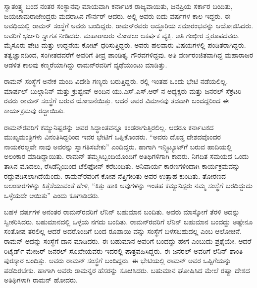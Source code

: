 ಸ್ವಾತಂತ್ರ್ಯ ಬಂದ ನಂತರ ಸಂಸ್ಥಾನವು ಮಾಯವಾಗಿ ಕರ್ನಾಟಕ ರಾಜ್ಯವಾಯಿತು, ಜನಪ್ರಿಯ ಸರ್ಕಾರ ಬಂದಿತು, ಜಯಚಾಮರಾಜೇಂದ್ರರು ಮದರಾಸಿನ ಗೌರ್ನರ್ ಆದರು. ಅಲ್ಲಿ ಅವರು ಐದು ವರ್ಷಗಳ ಕಾಲ ಇದ್ದರು. ಈ ಅವಧಿಯಲ್ಲಿ ರಾಮನ್ ಸಂಸ್ಥೆಗೆ ಅವರು ಬಂದಿದ್ದರು. ರಾಮನ್‍ರವರು ಆದ್ಧೂರಿಯ ಸಮಾರಂಭವನ್ನು ಆಯೋಜಿಸಿದರು. ಅವರಿಗೆ ಭರ್ಜರಿ ಸ್ವಾಗತ ನೀಡಿದರು. ಮಹಾರಾಜರು ನೋಡಲು ಆಕರ್ಷಕ ವ್ಯಕ್ತಿ. ಅತಿ ಗಂಭೀರ ಸ್ವರೂಪದವರು. ಮೈಸೂರು ಪೇಟ ಮತ್ತು ಉದ್ದನೆಯ ಕೋಟ್ ಧರಿಸುತ್ತಿದ್ದರು. ಅವರು ಹಲವಾರು ವಿಷಯಗಳಲ್ಲಿ ಪಂಡಿತರಾಗಿದ್ದರು. ತತ್ವಜ್ಞಾನದಿಂದ, ಸಂಗೀತದವರೆಗೆ ಅವರಿಗೆ ತೀವ್ರ ಪಾಂಡಿತ್ಯ, ಗೌರವಗಳಿದ್ದವು. ಅತಿ ವರ್ಣರಂಜಿತವಾಗಿದ್ದ ಮಹಾರಾಜರ ಆಡಳಿತ ಕಾಲವು ಕಣ್ಮರೆಯಾಗಿದ್ದು ರಾಮನ್‍ರವರಿಗೆ ವ್ಯಥೆಯುಂಟು ಮಾಡಿತ್ತು.



ರಾಮನ್ ಸಂಸ್ಥೆಗೆ ಅನೇಕ ಮಂದಿ ವಿದೇಶಿ ಗಣ್ಯರು ಬರುತ್ತಿದ್ದರು. ರಲ್ಲಿ ಇಂತಹ ಒಂದು ಭೇಟಿ ನಡೆಯಲಿಲ್ಲ. ಮಾರ್ಷಲ್ ಬುಲ್ಗಾನಿನ್ ಮತ್ತು ಕ್ರುಶ್ವೇವ್ ಅಂದಿನ ಯು.ಎಸ್.ಎಸ್.ಆರ್ ನ ಅಧ್ಯಕ್ಷರು ಮತ್ತು ಜನರಲ್ ಸೆಕ್ರೆಟರಿ ರವರು ರಾಮನ್ ಸಂಸ್ಥೆಗೆ ಬರುವ ಯೋಜನೆಯಿತ್ತು. ಆದರೆ ಅವರ ವಿಮಾನವು ತಡವಾಗಿ ಬಂದದ್ದರಿಂದ ಈ ಕಾರ್ಯಕ್ರಮವು ರದ್ದಾಯಿತು.

\newpage

ರಾಮನ್‍ರವರಿಗೆ ಕಮ್ಯುನಿಷ್ಟರನ್ನು ಅವರ ಸಿದ್ಧಾಂತವನ್ನೂ ಕಂಡರಾಗುತ್ತಿರಲಿಲ್ಲ. ಆದರೂ ಕರ್ನಾಟಕದ ಮುಖ್ಯಮಂತ್ರಿಗಳು ವಿನಂತಿಸಿದ್ದರಿಂದ ಇವರ ಭೇಟಿಗೆ ಒಪ್ಪಿಕೊಂಡರು. “ಅವರು ದೊಡ್ಡ ದೇಶದವೊಂದರ ನಾಯಕರಲ್ಲವೇ ನಾವು ಅವರನ್ನು ಸ್ವಾಗತಿಸಬೇಕು” ಎಂದಿದ್ದರು. ಹಾಗಾಗಿ ಇನ್ಸ್ಟಿಟ್ಯೂಟ್‍ಗೆ ಬರುವ ಹಾದಿಯಲ್ಲಿ ಅಲಂಕಾರ ಮಾಡಿದ್ದಾಯಿತು. ರಾಮನ್ ತಮ್ಮ\break ಸಿಬ್ಬಂದಿಯೊಂದಿಗೆ ಅತಿಥಿಗಳಿಗಾಗಿ ಕಾದರು. ನಿಗದಿತ ಸಮಯದ ಒಂದು ತಾಸಿನ ಮೊದಲು, ರೆಸಿಡೆನ್ಸಿಯಿಂದ ಟೆಲಿಫೋನ್ ಕರೆಬಂದಿತು. ಅನಿವಾರ್ಯ ಕಾರಣಗಳಿಂದಾಗಿ ಕಾರ್ಯಕ್ರಮವನ್ನು ರದ್ದುಪಡಿಸಲಾಗಿದೆಯೆಂದು. ರಾಮನ್‍ರವರಿಗೆ ಕೋಪ ನೆತ್ತಿಗೇರಿತು ಅವರ ಉತ್ಸಾಹ ಕುಂದಿತು. ತೋರಣದ ಅಲಂಕಾರಗಳನ್ನು ಕಿತ್ತೆಸೆಯುವಂತೆ ಹೇಳಿ, “ಕಿತ್ತು ಹಾಕಿ ಅವುಗಳನ್ನು ಇಂತಹ ಕಮ್ಯುನಿಸ್ಟರು ನಮ್ಮ ಸಂಸ್ಥೆಗೆ ಬರದಿದ್ದುದು ಒಳ್ಳೆಯದೇ ಆಯಿತು” ಎಂದು ಕೂಗಾಡಿದರು.

ಬಹಳ ವರ್ಷಗಳ ಅನಂತರ ರಾಮನ್‍ರವರಿಗೆ ಲೆನಿನ್ ಬಹುಮಾನ ಬಂದಿತು. ಅವರು ಮಾಸ್ಕೋಗೆ ತೆರಳಿ ಅದನ್ನು ಸ್ವೀಕರಿಸಿದರು. ಬಹುಮಾನದಲ್ಲಿ ಒಳ್ಳೆಯ ನಗದು ಬಂದಿತು. ರಾಮನ್‍ರವರಿಗೆ ಲೆನಿನ್ ಬಹುಮಾನ ಬಂದದ್ದು ಅಷ್ಟೇನೂ ಸಂತೋಷ ತರಲಿಲ್ಲ ಆದರೆ ಅದರೊಂದಿಗೆ ಬಂದ ರೂಪಾಯಿ  ವನ್ನು ಸಂಸ್ಥೆಗೆ ಬಳಸಬಹುದಲ್ಲ ಎಂಬ ಆಲೋಚನೆ. ರಾಮನ್ ಅದನ್ನು ಸಂಸ್ಥೆಗೆ ದಾನ ಮಾಡಿದರು. ಈ ಬಹುಮಾನ ಅವರಿಗೆ ಬಂದದ್ದು ಹೇಗೆ ಎಂಬುದು ಪ್ರಶ್ನೆಯೇ. ಆದರೆ ರಿಟೈರ್ಡ್ ಮೇಜರ್ ಜನರಲ್ ಸೊಖೇಯವರು ಇದರಲ್ಲಿ ಪಾತ್ರವಹಿಸಿದ್ದರು. ಈ ಜನರಲ್ ಅವರಿಗೆ ಲೆನಿನ್ ಶಾಂತಿ ಪುರಸ್ಕಾರ ಬಂದಿತ್ತು. ಅವರು ರಾಮನ್ ಸಂಸ್ಥೆಗೆ ಬಂದಿದ್ದರು. ಈ ಭೇಟಿಯಲ್ಲಿ ರಾಮನ್ ಅವರ ಒಪ್ಪಿಗೆಯನ್ನು ಪಡೆದಿರಬೇಕು. ಹಾಗಾಗಿ ಅವರು ರಾಮನ್ನರ ಹೆಸರನ್ನು ಸೂಚಿಸಿದರು. ಬಹುಮಾನ ಘೋಷಿಸಿದ ಮೇಲೆ ರಷ್ಯಾ ದೇಶದ ಅತಿಥಿಗಳಾಗಿ ರಾಮನ್ ಹೋದರು.

